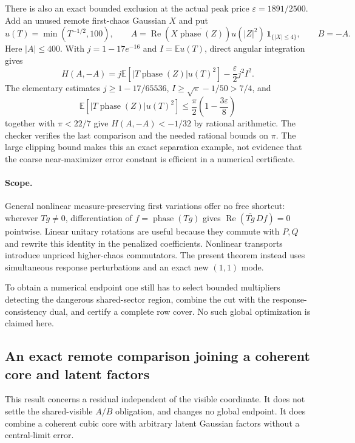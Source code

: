 There is also an exact bounded exclusion at the actual peak price
$\varepsilon=1891/2500$. Add an unused remote first-chaos Gaussian $X$
and put
\[
 u(T)=\min(T^{-1/2},100),\qquad
 A=\operatorname{Re}(X\overline{\operatorname{phase}(Z)})
       u(|Z|^2)\,\mathbf1_{\{|X|\le4\}},\qquad B=-A.
\]
Here $|A|\le400$. With $j=1-17e^{-16}$ and $I=\mathbb Eu(T)$,
direct angular integration gives
\[
 H(A,-A)=j\mathbb E[|T\operatorname{phase}(Z)|u(T)^2]
                 -\frac\varepsilon2j^2I^2.
\]
The elementary estimates
$j\ge1-17/65536$, $I\ge\sqrt\pi-1/50>7/4$, and
\[
 \mathbb E[|T\operatorname{phase}(Z)|u(T)^2]
 \le\frac\pi2\left(1-\frac{3\varepsilon}8\right)
\]
together with $\pi<22/7$ give $H(A,-A)<-1/32$ by rational
arithmetic. The checker verifies the last comparison and the
needed rational bounds on $\pi$. The large clipping bound makes
this an exact separation example, not evidence that the coarse
near-maximizer error constant is efficient in a numerical certificate.

\paragraph{Scope.}
General nonlinear measure-preserving first variations offer no free
shortcut: wherever $Tg\ne0$, differentiation of
$f=\operatorname{phase}(Tg)$ gives
$\operatorname{Re}(\overline{Tg}\,Df)=0$ pointwise. Linear unitary
rotations are useful because they commute with $P,Q$ and rewrite this
identity in the penalized coefficients. Nonlinear transports introduce
unpriced higher-chaos commutators. The present theorem instead uses
simultaneous response perturbations and an exact new $(1,1)$ mode.

To obtain a numerical endpoint one still has to select bounded
multipliers detecting the dangerous shared-sector region, combine the
cut with the response-consistency dual, and certify a complete row
cover. No such global optimization is claimed here.

\subsection{An exact remote comparison joining a coherent core and latent factors}
\label{sec:remote-core-factor-cone}

This result concerns a residual independent of the visible coordinate. It does
not settle the shared-visible $A/B$ obligation, and changes no global endpoint.
It does combine a coherent cubic core with arbitrary latent Gaussian factors
without a central-limit error.

